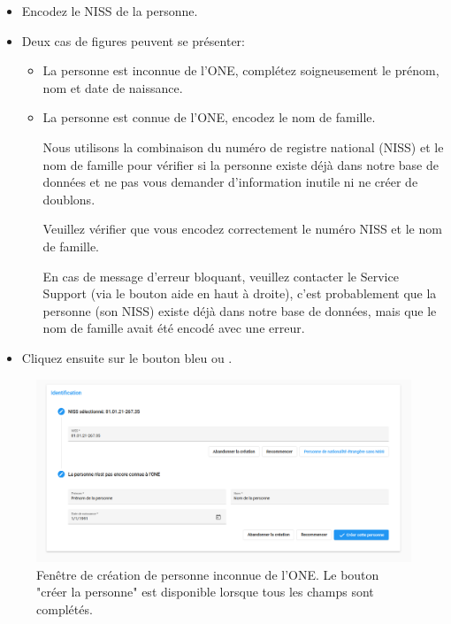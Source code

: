 \begin{itemize}
    \item Encodez le NISS de la personne. 
    \item Deux cas de figures peuvent se présenter: 
    \begin{itemize}
        \item La personne est inconnue de l'ONE, complétez soigneusement le prénom, nom et date de naissance.
        \item La personne est connue de l'ONE, encodez le nom de famille. 
        
        \begin{information}
         Nous utilisons la combinaison du numéro de registre national (NISS) et le nom de famille pour vérifier si la personne existe déjà dans notre base de données et ne pas vous demander d’information inutile ni ne créer de doublons.
        \end{information}
        
        Veuillez vérifier que vous encodez correctement le numéro NISS et le nom de famille. 
        
        \begin{attention}
        En cas de message d’erreur bloquant, veuillez contacter le Service Support (via le bouton aide en haut à droite), c’est probablement que la personne (son NISS) existe déjà dans notre base de données, mais que le nom de famille avait été encodé avec une erreur.
        \end{attention}
    \end{itemize}
    \item Cliquez ensuite sur le bouton bleu  ou .
\end{itemize}

\begin{figure}[h]
    \centering
    \includegraphics[width=13cm]{Images/team/create_person.png}
    \caption{Fenêtre de création de personne inconnue de l'ONE. Le bouton "créer la personne" est disponible lorsque tous les champs sont complétés.}
    \label{fig:création_personne}
\end{figure}


